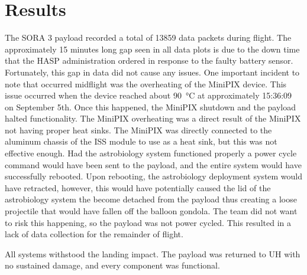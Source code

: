 \section{Results}
\label{sec:Results}

The SORA 3 payload recorded a total of 13859 data packets during flight.
The approximately 15 minutes long gap seen in all data plots is due to the down time that the HASP administration ordered in response to the faulty battery sensor.
Fortunately, this gap in data did not cause any issues.
One important incident to note that occurred midflight was the overheating of the MiniPIX device.
This issue occurred when the device reached about \SI{90}{\celsius} at approximately 15:36:09 on September 5th.
Once this happened, the MiniPIX shutdown and the payload halted functionality.
The MiniPIX overheating was a direct result of the MiniPIX not having proper heat sinks.
The MiniPIX was directly connected to the aluminum chassis of the ISS module to use as a heat sink, but this was not effective enough.
Had the astrobiology system functioned properly a power cycle command would have been sent to the payload, and the entire system would have successfully rebooted.
Upon rebooting, the astrobiology deployment system would have retracted, however, this would have potentially caused the lid of the astrobiology system the become detached from the payload thus creating a loose projectile that would have fallen off the balloon gondola.
The team did not want to risk this happening, so the payload was not power cycled.
This resulted in a lack of data collection for the remainder of flight.

All systems withstood the landing impact.
The payload was returned to UH with no sustained damage, and every component was functional.

